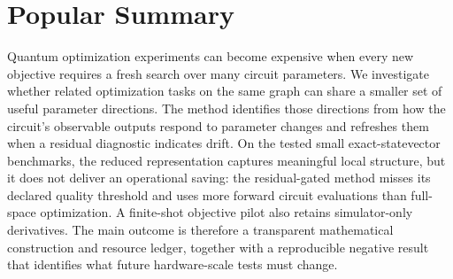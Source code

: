 \section*{Popular Summary}

Quantum optimization experiments can become expensive when every new objective
requires a fresh search over many circuit parameters.  We investigate whether
related optimization tasks on the same graph can share a smaller set of useful
parameter directions.  The method identifies those directions from how the
circuit's observable outputs respond to parameter changes and refreshes them
when a residual diagnostic indicates drift.  On the tested small
exact-statevector benchmarks, the reduced representation captures meaningful
local structure, but it does not deliver an operational saving: the
residual-gated method misses its declared quality threshold and uses more
forward circuit evaluations than full-space optimization.  A finite-shot
objective pilot also retains simulator-only derivatives.  The main outcome is
therefore a transparent mathematical construction and resource ledger,
together with a reproducible negative result that identifies what future
hardware-scale tests must change.
